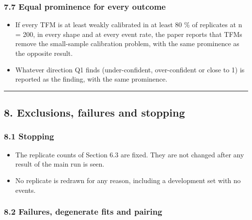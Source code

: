 \documentclass[
  10pt,
]{article}
\providecommand{\tightlist}{%
  \setlength{\itemsep}{0pt}\setlength{\parskip}{0pt}}
\begin{document}
\subsubsection{7.7 Equal prominence for every
outcome}\label{equal-prominence-for-every-outcome}

\begin{itemize}
\tightlist
\item
  If every TFM is at least weakly calibrated in at least 80
  \% of replicates at n = 200, in every shape and at every
  event rate, the paper reports that TFMs remove the
  small-sample calibration problem, with the same prominence
  as the opposite result.
\item
  Whatever direction Q1 finds (under-confident,
  over-confident or close to 1) is reported as the finding,
  with the same prominence.
\end{itemize}

\begin{center}\rule{0.5\linewidth}{0.5pt}\end{center}

\subsection{8. Exclusions, failures and
stopping}\label{exclusions-failures-and-stopping}

\subsubsection{8.1 Stopping}\label{stopping}

\begin{itemize}
\tightlist
\item
  The replicate counts of Section 6.3 are fixed. They are
  not changed after any result of the main run is seen.
\item
  No replicate is redrawn for any reason, including a
  development set with no events.
\end{itemize}

\subsubsection{8.2 Failures, degenerate fits and
pairing}\label{failures-degenerate-fits-and-pairing}
\end{document}
